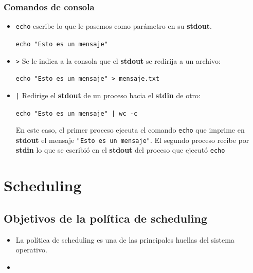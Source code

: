 \subsubsection{Comandos de consola}
\begin{itemize}
	\item \texttt{echo} escribe lo que le pasemos como parámetro en su \textbf{stdout}.
	\begin{center}
		\texttt{echo "Esto es un mensaje"}
	\end{center}
	\item \texttt{>} Se le indica a la consola que el \textbf{stdout} se redirija a un archivo:
	\begin{center}
		\texttt{echo "Esto es un mensaje" > mensaje.txt}
	\end{center}
	\item \texttt{|} Redirige el \textbf{stdout} de un proceso hacia el \textbf{stdin} de otro:
	
	\begin{center}
		\texttt{echo "Esto es un mensaje" | wc -c}
	\end{center}

	En este caso, el primer proceso ejecuta el comando \texttt{echo} que imprime en \textbf{stdout} el mensaje \texttt{"Esto es un mensaje"}. El segundo proceso recibe por \textbf{stdin} lo que se escribió en el \textbf{stdout} del proceso que ejecutó \texttt{echo}
\end{itemize}

\newpage
	
\section{Scheduling}
	\subsection{Objetivos de la política de scheduling}
	\begin{itemize}
		\item La política de scheduling es una de las principales huellas del sistema operativo.
		\item 
	\end{itemize}
	\subsection{}
	\subsection{}
